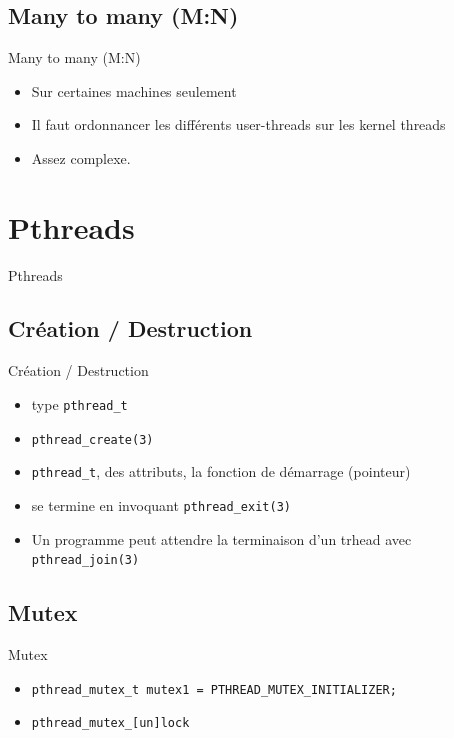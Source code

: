 \section{\sectitle}
\begin{frame}{\sectitle}
    \def\subsectitle{Many to many (M:N)}
    \subsection{\subsectitle}
    \begin{block}{\subsectitle}
        \begin{itemize}
            \item Sur certaines machines seulement
            \item Il faut ordonnancer les différents user-threads sur les kernel
                threads
            \item Assez complexe.
        \end{itemize}
    \end{block}
\end{frame}


\def\sectitle{Pthreads}
\section{\sectitle}
\begin{frame}[containsverbatim]{\sectitle}
    \def\subsectitle{Création / Destruction}
    \subsection{\subsectitle}
    \begin{block}{\subsectitle}
        \begin{itemize}
            \item type \verb+pthread_t+
            \item \verb+pthread_create(3)+ 
            \item \verb+pthread_t+, des attributs, la fonction de démarrage
                (pointeur)
            \item se termine en invoquant \verb+pthread_exit(3)+
            \item Un programme peut attendre la terminaison d'un trhead avec
                \verb+pthread_join(3)+
        \end{itemize}
    \end{block}


    \def\subsectitle{Mutex}
    \subsection{\subsectitle}
    \begin{block}{\subsectitle}
        \begin{itemize}
            \item \verb+pthread_mutex_t mutex1 = PTHREAD_MUTEX_INITIALIZER;+
            \item \verb+pthread_mutex_[un]lock+
        \end{itemize}
    \end{block}
\end{frame}


